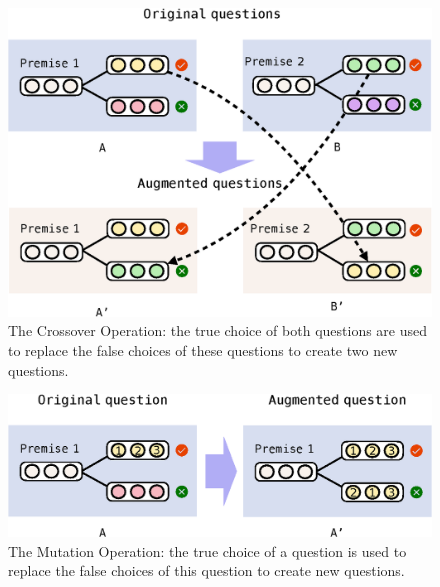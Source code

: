 \begin{figure}[th]
 	\centering
 	\includegraphics[width=\columnwidth]{figure/cross.eps}
 	\caption{The Crossover Operation: the true choice of both questions
 		are used to replace the false choices of these questions to create
 		two new questions.}
 	\label{fig:cross}
\end{figure}
\begin{figure}[th]
 	\centering
 	\includegraphics[width=\columnwidth]{figure/mutation.eps}
 	\caption{The Mutation Operation: the true choice of a question
 		is used to replace the false choices of this question to create
 		new questions.}
 	\label{fig:mutation}
\end{figure}





